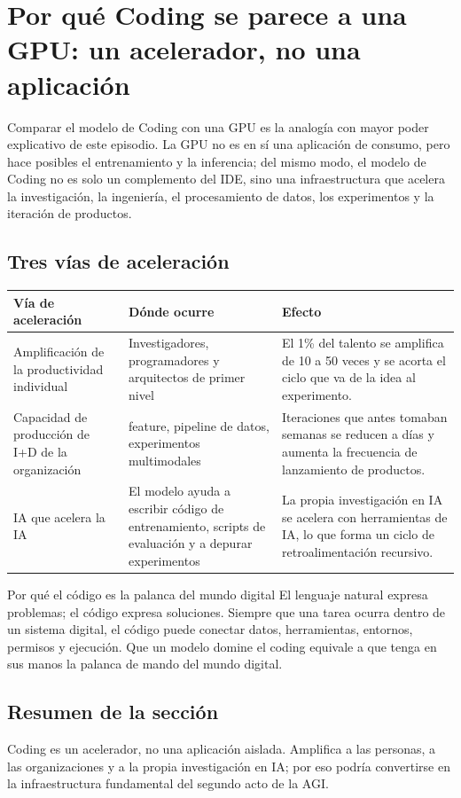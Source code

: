 \section{Por qué Coding se parece a una GPU: un acelerador, no una aplicación}

Comparar el modelo de Coding con una GPU es la analogía con mayor poder explicativo de este episodio. La GPU no es en sí una aplicación de consumo, pero hace posibles el entrenamiento y la inferencia; del mismo modo, el modelo de Coding no es solo un complemento del IDE, sino una infraestructura que acelera la investigación, la ingeniería, el procesamiento de datos, los experimentos y la iteración de productos.

\subsection{Tres vías de aceleración}

\noindent\begin{tabularx}{\textwidth}{p{}p{}X}
\toprule
Vía de aceleración & Dónde ocurre & Efecto \\
\midrule
Amplificación de la productividad individual & Investigadores, programadores y arquitectos de primer nivel & El 1\% del talento se amplifica de 10 a 50 veces y se acorta el ciclo que va de la idea al experimento. \\
Capacidad de producción de I+D de la organización & feature, pipeline de datos, experimentos multimodales & Iteraciones que antes tomaban semanas se reducen a días y aumenta la frecuencia de lanzamiento de productos. \\
IA que acelera la IA & El modelo ayuda a escribir código de entrenamiento, scripts de evaluación y a depurar experimentos & La propia investigación en IA se acelera con herramientas de IA, lo que forma un ciclo de retroalimentación recursivo. \\
\bottomrule
\end{tabularx}

\begin{knowledgebox}{Por qué el código es la palanca del mundo digital}
El lenguaje natural expresa problemas; el código expresa soluciones. Siempre que una tarea ocurra dentro de un sistema digital, el código puede conectar datos, herramientas, entornos, permisos y ejecución. Que un modelo domine el coding equivale a que tenga en sus manos la palanca de mando del mundo digital.
\end{knowledgebox}

\subsection{Resumen de la sección}

Coding es un acelerador, no una aplicación aislada. Amplifica a las personas, a las organizaciones y a la propia investigación en IA; por eso podría convertirse en la infraestructura fundamental del segundo acto de la AGI.

